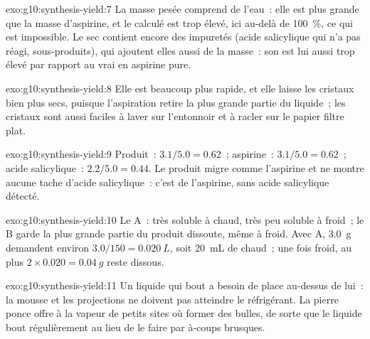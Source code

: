 \begin{solution}{exo:g10:synthesis-yield:7}
La masse pesée comprend de l'eau~: elle est plus grande que la masse
d'aspirine, et le  calculé est trop élevé, ici au-delà de
\qty{100}{\percent}, ce qui est impossible. Le  sec contient
encore des impuretés (acide salicylique qui n'a pas réagi,
sous-produits), qui ajoutent elles aussi de la masse~: son  est
lui aussi trop élevé par rapport au vrai  en aspirine pure.
\end{solution}

\begin{solution}{exo:g10:synthesis-yield:8}
Elle est beaucoup plus rapide, et elle laisse les cristaux bien plus
secs, puisque l'aspiration retire la plus grande partie du liquide~; les
cristaux sont aussi faciles à laver sur l'entonnoir et à racler sur le
papier filtre plat.
\end{solution}

\begin{solution}{exo:g10:synthesis-yield:9}
Produit~: $3.1/5.0 = 0.62$~; aspirine~: $3.1/5.0 = 0.62$~; acide
salicylique~: $2.2/5.0 = 0.44$. Le produit migre comme l'aspirine et ne
montre aucune tache d'acide salicylique~: c'est de l'aspirine, sans
acide salicylique détecté.
\end{solution}

\begin{solution}{exo:g10:synthesis-yield:10}
Le  A~: très soluble à chaud, très peu soluble à froid~; le
 B garde la plus grande partie du produit dissoute, même à froid.
Avec A, \qty{3.0}{g} demandent environ $3.0 / 150 = \qty{0.020}{L}$, soit
\qty{20}{mL} de  chaud~; une fois froid, au plus
$2 \times 0.020 = \qty{0.04}{g}$ reste dissous.
\end{solution}

\begin{solution}{exo:g10:synthesis-yield:11}
Un liquide qui bout a besoin de place au-dessus de lui~: la mousse et
les projections ne doivent pas atteindre le réfrigérant. La pierre ponce
offre à la vapeur de petits sites où former des bulles, de sorte que le
liquide bout régulièrement au lieu de le faire par à-coups brusques.
\end{solution}

